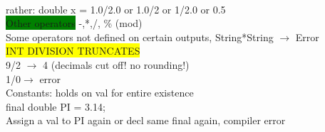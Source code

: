 \\ rather: double x = 1.0/2.0 or 1.0/2 or 1/2.0 or 0.5
\\ \colorbox{Green}{Other operators} -,*,/, \% (mod)
\\ Some operators not defined on certain outputs, String*String $\rightarrow$ Error
\\ \colorbox{Yellow}{INT DIVISION TRUNCATES}
\\ 9/2 $\rightarrow$ 4 (decimals cut off! no rounding!)
\\ 1/0$\rightarrow$ error
\\ Constants: holds on val for entire existence
\\ final double PI = 3.14;
\\ Assign a val to PI again or decl same final again, compiler error
